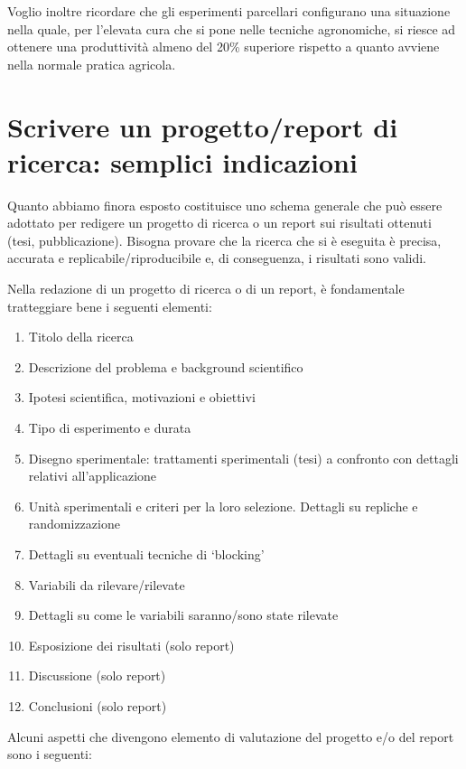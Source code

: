 \documentclass[a4paper,12pt,oneside]{book}
\providecommand{\tightlist}{%
  \setlength{\itemsep}{0pt}\setlength{\parskip}{0pt}}
\begin{document}
Voglio inoltre ricordare che gli esperimenti parcellari configurano una situazione nella quale, per l'elevata cura che si pone nelle tecniche agronomiche, si riesce ad ottenere una produttività almeno del 20\% superiore rispetto a quanto avviene nella normale pratica agricola.

\hypertarget{scrivere-un-progettoreport-di-ricerca-semplici-indicazioni}{%
\section{Scrivere un progetto/report di ricerca: semplici indicazioni}\label{scrivere-un-progettoreport-di-ricerca-semplici-indicazioni}}

Quanto abbiamo finora esposto costituisce uno schema generale che può essere adottato per redigere un progetto di ricerca o un report sui risultati ottenuti (tesi, pubblicazione). Bisogna provare che la ricerca che si è eseguita è precisa, accurata e replicabile/riproducibile e, di conseguenza, i risultati sono validi.

Nella redazione di un progetto di ricerca o di un report, è fondamentale tratteggiare bene i seguenti elementi:

\begin{enumerate}
\def\labelenumi{\arabic{enumi}.}
\tightlist
\item
  Titolo della ricerca
\item
  Descrizione del problema e background scientifico
\item
  Ipotesi scientifica, motivazioni e obiettivi
\item
  Tipo di esperimento e durata
\item
  Disegno sperimentale: trattamenti sperimentali (tesi) a confronto con dettagli relativi all'applicazione
\item
  Unità sperimentali e criteri per la loro selezione. Dettagli su repliche e randomizzazione
\item
  Dettagli su eventuali tecniche di `blocking'
\item
  Variabili da rilevare/rilevate
\item
  Dettagli su come le variabili saranno/sono state rilevate
\item
  Esposizione dei risultati (solo report)
\item
  Discussione (solo report)
\item
  Conclusioni (solo report)
\end{enumerate}

Alcuni aspetti che divengono elemento di valutazione del progetto e/o del report sono i seguenti:
\end{document}
